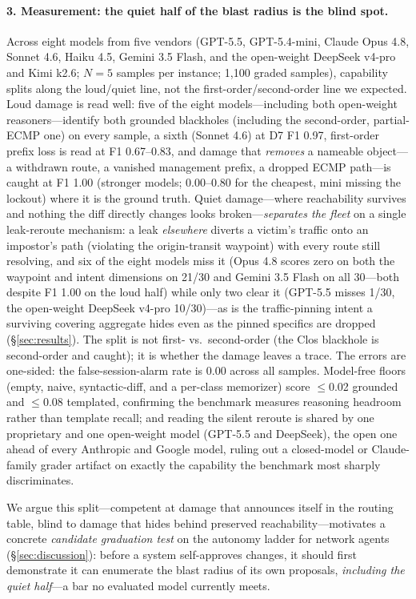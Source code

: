 \documentclass[11pt]{article}
\begin{document}
\paragraph{3. Measurement: the quiet half of the blast radius is the blind
spot.} Across eight models from five vendors (GPT-5.5, GPT-5.4-mini, Claude
Opus 4.8, Sonnet 4.6, Haiku 4.5, Gemini 3.5 Flash, and the open-weight
DeepSeek v4-pro and Kimi k2.6; $N{=}5$ samples per instance; 1{,}100 graded
samples), capability splits along the loud/quiet line, not the
first-order/second-order line we expected. Loud damage is read well: five of
the eight models---including both open-weight reasoners---identify both
grounded blackholes (including the second-order, partial-ECMP one) on every
sample, a sixth (Sonnet 4.6) at D7 F1 0.97, first-order prefix loss is read
at F1 0.67--0.83, and damage that
\emph{removes} a nameable object---a withdrawn route, a vanished management
prefix, a dropped ECMP path---is caught at F1 1.00 (stronger models;
0.00--0.80 for the cheapest, mini missing the lockout) where it is the ground
truth. Quiet
damage---where reachability survives and nothing the diff directly changes
looks broken---\emph{separates the fleet} on a single leak-reroute mechanism:
a leak \emph{elsewhere} diverts a victim's traffic onto an impostor's path
(violating the origin-transit waypoint) with every route still resolving, and
six of the eight models miss it (Opus 4.8 scores zero on both the waypoint and
intent dimensions on 21/30 and Gemini 3.5 Flash on all 30---both despite F1
1.00 on the loud half) while only two clear it (GPT-5.5 misses
1/30, the open-weight DeepSeek v4-pro 10/30)---as is the traffic-pinning
intent a surviving covering aggregate hides even as the pinned specifics are
dropped (\S\ref{sec:results}). The split is not first- vs.\ second-order
(the Clos blackhole is second-order and caught); it is whether the damage
leaves a trace. The errors are one-sided: the false-session-alarm rate is
0.00 across all samples. Model-free floors (empty, naive, syntactic-diff,
and a per-class memorizer) score $\leq$0.02 grounded and $\leq$0.08
templated, confirming the benchmark measures reasoning headroom rather than
template recall; and reading the silent reroute is shared by one proprietary
and one open-weight model (GPT-5.5 and DeepSeek), the open one ahead of every
Anthropic and Google model, ruling out a closed-model or Claude-family grader
artifact on exactly the capability the benchmark most sharply discriminates.

We argue this split---competent at damage that announces itself in the
routing table, blind to damage that hides behind preserved
reachability---motivates a concrete \emph{candidate graduation test} on the
autonomy ladder for network agents (\S\ref{sec:discussion}): before a system
self-approves changes, it should first demonstrate it can enumerate the
blast radius of its own proposals, \emph{including the quiet half}---a bar
no evaluated model currently meets.
\end{document}
